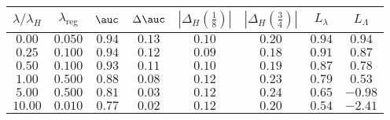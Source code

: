 \begin{tabular}{cccccccc} 
\toprule 
$\lambda / \lambda_H$ & $\lambda_\text{reg}$ & $\auc$ & $\Delta \auc$ 
& $|\Delta_H(\frac{1}{8})|$ & $|\Delta_H(\frac{3}{4})|$ & $L_\lambda$ & $L_\Lambda$ \\ 
\midrule 
$0.00$ & $0.050$ & $0.94$ & $0.13$ & $0.10$ & $0.20$ & $0.94$ & $0.94$ \\ 
$0.25$ & $0.100$ & $0.94$ & $0.12$ & $0.09$ & $0.18$ & $0.91$ & $0.87$ \\ 
$0.50$ & $0.100$ & $0.93$ & $0.11$ & $0.10$ & $0.19$ & $0.87$ & $0.78$ \\ 
$1.00$ & $0.500$ & $0.88$ & $0.08$ & $0.12$ & $0.23$ & $0.79$ & $0.53$ \\ 
$5.00$ & $0.500$ & $0.81$ & $0.03$ & $0.12$ & $0.24$ & $0.65$ & $-0.98$ \\ 
$10.00$ & $0.010$ & $0.77$ & $0.02$ & $0.12$ & $0.20$ & $0.54$ & $-2.41$ \\ 
\bottomrule 
\end{tabular} 
